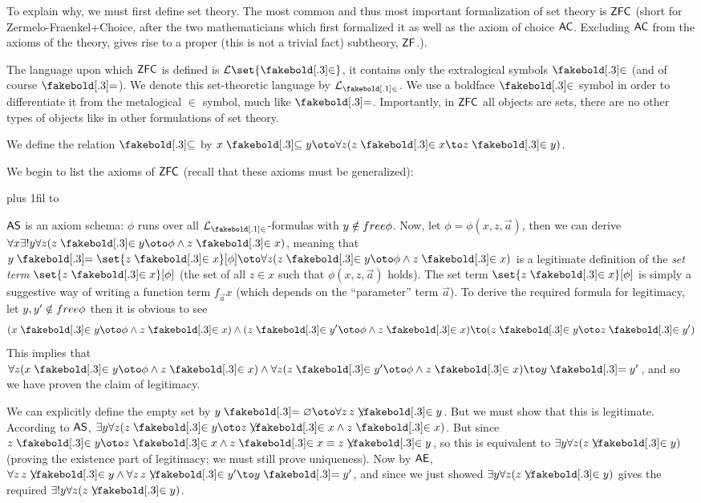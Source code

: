 To explain why, we must first define set theory.
The most common and thus most important formalization of set theory is ${\sf ZFC}$ (short for Zermelo-Fraenkel+Choice, after the two mathematicians which first formalized it as well as the axiom of choice
${\sf AC}$.
Excluding ${\sf AC}$ from the axioms of the theory, gives rise to a proper (this is not a trivial fact) subtheory, ${\sf ZF}$.).

The language upon which ${\sf ZFC}$ is defined is ${\cal L}\set{\inb}$, it contains only the extralogical symbols $\inb$ (and of course $\eq$).
We denote this set-theoretic language by ${\cal L}_{\inb}$.
We use a boldface $\inb$ symbol in order to differentiate it from the metalogical $\in$ symbol, much like $\eq$.
Importantly, in ${\sf ZFC}$ all objects are sets, there are no other types of objects like in other formulations of set theory.

We define the relation $\subseteqb$ by $x\subseteqb y\oto\forall z(z\inb x\to z\inb y)$.

We begin to list the axioms of ${\sf ZFC}$ (recall that these axioms must be generalized):

\medskip
\tabskip=0pt plus 1fil
{\jot\halign to}
\medskip

${\sf AS}$ is an axiom schema: $\phi$ runs over all ${\cal L}_{\inb}$-formulas with $y\notin{\sl free}\phi$.
Now, let $\phi=\phi(x,z,\vec a)$, then we can derive $\forall x\exists!y\forall z(z\inb y\oto\phi\land z\inb x)$, meaning that $y\eq\set{z\inb x}[\phi]\oto\forall z(z\inb y\oto\phi\land z\inb x)$ is a
legitimate definition of the {\it set term} $\set{z\inb x}[\phi]$ (the set of all $z\in x$ such that $\phi(x,z,\vec a)$ holds).
The set term $\set{z\inb x}[\phi]$ is simply a suggestive way of writing a function term $f_{\vec a}x$ (which depends on the ``parameter'' term $\vec a$).
To derive the required formula for legitimacy, let $y,y'\notin{\sl free}\phi$ then it is obvious to see
$$ (x\inb y\oto\phi\land z\inb x)\land(z\inb y'\oto\phi\land z\inb x)\to(z\inb y\oto z\inb y') $$
This implies that $\forall z(x\inb y\oto\phi\land z\inb x)\land\forall z(z\inb y'\oto\phi\land z\inb x)\to y\eq y'$, and so we have proven the claim of legitimacy.

We can explicitly define the empty set by $y\eq\varnothing\oto\forall z\,z\notinb y$.
But we must show that this is legitimate.
According to ${\sf AS}$, $\exists y\forall z(z\inb y\oto z\notinb x\land z\inb x)$.
But since $z\inb y\oto z\inb x\land z\inb x\equiv z\notinb y$, so this is equivalent to $\exists y\forall z(z\notinb y)$ (proving the existence part of legitimacy; we must still prove uniqueness).
Now by ${\sf AE}$, $\forall z\,z\notinb y\land\forall z\,z\notinb y'\to y\eq y'$, and since we just showed $\exists y\forall z(z\notinb y)$ gives the required $\exists!y\forall z(z\notinb y)$.

